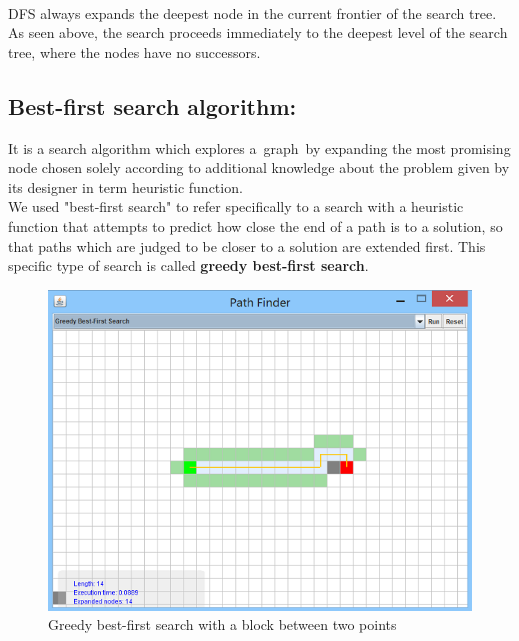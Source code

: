 \documentclass[a4paper]{article}
\begin{document}
\noindent \\
DFS always expands the deepest node in the current frontier of the search tree. As seen above, the search proceeds immediately to the deepest level of the search tree, where the nodes have no successors.


\subsection{Best-first search algorithm:}

It is a search algorithm which explores a graph by expanding the most promising node chosen solely according to additional knowledge about the problem given by its designer in term heuristic function.\\

\noindent We used "best-first search" to refer specifically to a search with a heuristic function that attempts to predict how close the end of a path is to a solution, so that paths which are judged to be closer to a solution are extended first. This specific type of search is called \textbf{greedy best-first search}. \\

\begin{figure}[h!]
  \centering
    \includegraphics[scale=.9]{images/greedy1.png}
  \caption{Greedy best-first search with a block between two points}
\end{figure}
\end{document}

